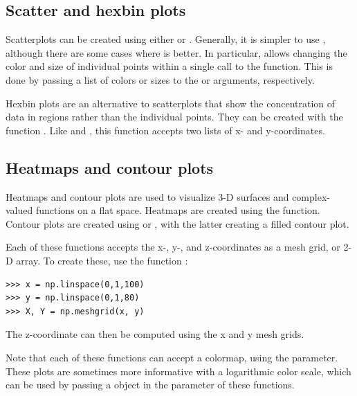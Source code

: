 \subsection*{Scatter and hexbin plots}
Scatterplots can be created using either  or .
Generally, it is simpler to use , although there are some cases where   is better.
In particular,  allows changing the color and size of individual points within a single call to the function.
This is done by passing a list of colors or sizes to the  or  arguments, respectively.

Hexbin plots are an alternative to scatterplots that show the concentration of data in regions rather than the individual points.
They can be created with the function .
Like  and , this function accepts two lists of x- and y-coordinates.


\subsection*{Heatmaps and contour plots}
Heatmaps and contour plots are used to visualize 3-D surfaces and complex-valued functions on a flat space.
Heatmaps are created using the  function.
Contour plots are created using  or , with the latter creating a filled contour plot.

Each of these functions accepts the x-, y-, and z-coordinates as a mesh grid, or 2-D array.
To create these, use the function :
\begin{lstlisting}
>>> x = np.linspace(0,1,100)
>>> y = np.linspace(0,1,80)
>>> X, Y = np.meshgrid(x, y)
\end{lstlisting} 
The z-coordinate can then be computed using the x and y mesh grids.

Note that each of these functions can accept a colormap, using the  parameter.
These plots are sometimes more informative with a logarithmic color scale, which can be used by passing a  object in the  parameter of these functions.

